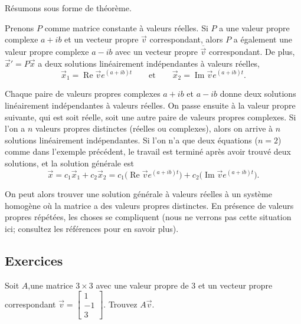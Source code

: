 \medskip

Résumons sous forme de théorème.

\begin{theorem}
Prenons $P$ comme matrice constante à valeurs réelles. Si $P$ a une valeur propre complexe $a+ib$ et un vecteur propre
$\vec{v}$ correspondant, alors $P$ a également une valeur propre complexe $a-ib$ avec un vecteur propre $\overline{\vec{v}}$ correspondant.
De plus,
${\vec{x}}' = P\vec{x}$
a deux solutions linéairement indépendantes à valeurs réelles,
\begin{equation*}
\vec{x}_1 = \operatorname{Re} \vec{v} e^{(a+ib)t} 
\qquad
\text{et}
\qquad
\vec{x}_2 = \operatorname{Im} \vec{v} e^{(a+ib)t} .
\end{equation*}
\end{theorem}

Chaque paire de valeurs propres complexes $a+ib$ et $a-ib$
donne deux solutions linéairement indépendantes à valeurs réelles. On passe ensuite à la valeur propre suivante, qui est soit réelle, soit une autre paire de valeurs propres complexes. Si l'on a $n$ valeurs propres distinctes (réelles ou complexes), alors on arrive à $n$ solutions linéairement indépendantes. Si l'on n'a que deux équations ($n=2$) comme dans l'exemple précédent, le travail est terminé après avoir trouvé deux solutions, et la solution générale est
\begin{equation*}
\vec{x} =
c_1 \vec{x}_1 + c_2 \vec{x}_2
= 
c_1 \bigl( \operatorname{Re} \vec{v} e^{(a+ib)t} \bigr) +
c_2 \bigl( \operatorname{Im} \vec{v} e^{(a+ib)t} \bigr)
.
\end{equation*}

On peut alors trouver une solution générale à valeurs réelles à un système homogène où la matrice a des valeurs propres distinctes. En présence de valeurs propres répétées, les choses se compliquent (nous ne verrons pas cette situation ici; consultez les références pour en savoir plus).

\subsection{Exercices}

\begin{exercise}[facile]
Soit $A$,une matrice $3 \times 3$ avec une valeur propre de 3 et un vecteur propre correspondant $\vec{v} =
\left[ \begin{smallmatrix} 1 \\ -1 \\ 3 \end{smallmatrix} \right]$.
Trouvez $A \vec{v}$.
\end{exercise}

